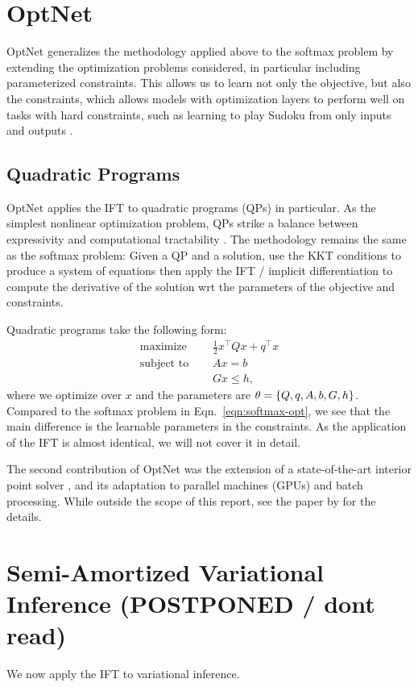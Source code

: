 \documentclass[11pt]{article}
\begin{document}
\section{OptNet}
OptNet generalizes the methodology applied above to the softmax problem by
extending the optimization problems considered,
in particular including parameterized constraints.
This allows us to learn not only the objective, but also the constraints,
which allows models with optimization layers to perform well
on tasks with hard constraints, such as learning to play
Sudoku from only inputs and outputs \citep{optnet}.

\subsection{Quadratic Programs}
OptNet applies the IFT to quadratic programs (QPs) in particular.
As the simplest nonlinear optimization problem,
QPs strike a balance between expressivity and computational tractability \citep{simplex}.
The methodology remains the same as the softmax problem:
Given a QP and a solution,
use the KKT conditions to produce a system of equations then apply the IFT
/ implicit differentiation to compute the derivative of the solution wrt the
parameters of the objective and constraints.

Quadratic programs take the following form:
\begin{equation}
\label{eqn:qp}
\begin{aligned}
\textrm{maximize } \quad & \frac12 x^\top Q x + q^\top x\\
\textrm{subject to } \quad & Ax = b\\
& Gx \leq h,
\end{aligned}
\end{equation}
where we optimize over $x$ and the parameters are $\theta = \left\{Q, q, A, b, G, h\right\}$.
Compared to the softmax problem in Eqn.~\ref{eqn:softmax-opt},
we see that the main difference is the learnable parameters in the constraints.
As the application of the IFT is almost identical, we will not cover it in detail.

The second contribution of OptNet was the extension of a state-of-the-art interior point
solver \citep{optnet}, and its adaptation to parallel machines (GPUs) and batch processing.
While outside the scope of this report, see the paper by \citet{optnet} for the details.

\section{Semi-Amortized Variational Inference (POSTPONED / dont read)}
We now apply the IFT to variational inference.
\end{document}
